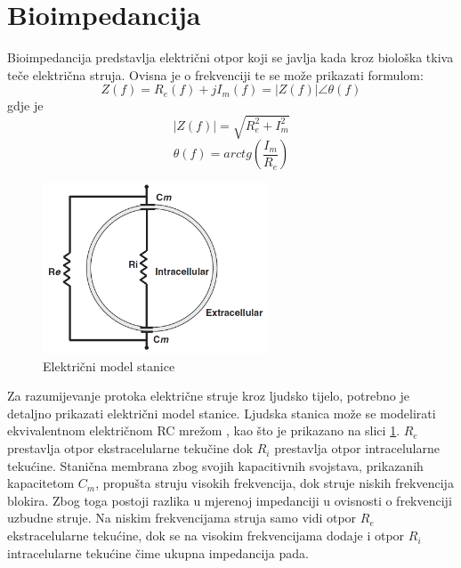 \documentclass[../diplomski_rad.tex]{subfiles}
\begin{document}
\sloppy

\justifying

\section{Bioimpedancija}

Bioimpedancija predstavlja električni otpor koji se javlja kada kroz biološka tkiva teče električna struja.
Ovisna je o frekvenciji te se može prikazati formulom:
\begin{equation}
    \label{jed:cpe}
    Z(f) = R_{e}(f) + jI_{m}(f) = |Z(f)|\angle\theta(f) 
\end{equation}
gdje je
\begin{equation}
    \label{jed:cpe}
    |Z(f)| = \sqrt{R_{e}^{2} + I_{m}^{2}}
\end{equation} 
\begin{equation}
    \label{jed:cpe}
    \theta(f) = arctg(\frac{I_{m}}{R_{e}})
\end{equation} 

\begin{figure}[htb]
    \centering
    \includegraphics[width=0.6\textwidth]{Figures/stanica.png} 
    \caption{Električni model stanice \cite{Lukaski2013}}
    \label{slk:stanica}
\end{figure}
Za razumijevanje protoka električne struje kroz ljudsko tijelo, potrebno je detaljno prikazati električni model stanice.
Ljudska stanica može se modelirati ekvivalentnom električnom RC mrežom \cite{Lukaski2013}, 
kao što je prikazano na slici \ref{slk:stanica}. 
$R_{e}$ prestavlja otpor ekstracelularne tekučine dok $R_{i}$ prestavlja otpor intracelularne tekućine.
Stanična membrana zbog svojih kapacitivnih svojstava, prikazanih kapacitetom $C_{m}$, 
propušta struju visokih frekvencija, dok struje niskih frekvencija blokira. 
Zbog toga postoji razlika u mjerenoj impedanciji u ovisnosti o frekvenciji uzbudne struje. 
Na niskim frekvencijama struja samo vidi otpor $R_{e}$ ekstracelularne tekućine, dok se na visokim frekvencijama dodaje i otpor 
$R_{i}$ intracelularne tekućine čime ukupna impedancija pada.
\end{document}

